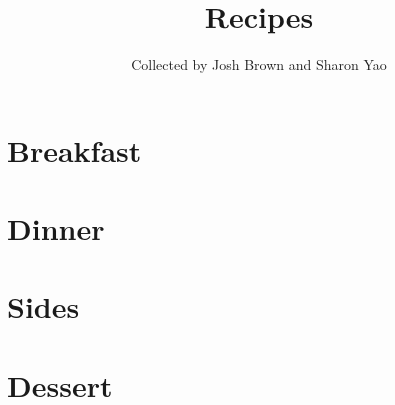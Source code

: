 \documentclass[oneside,10pt]{book}
\title{\bf \Huge Recipes}
\author{Collected by Josh Brown and Sharon Yao}
\date{}
\begin{document}
\maketitle
\tableofcontents{}

\chapter{Breakfast}
    
    
    
    
    

\chapter{Dinner}
    
    
    
    
    
    
    
    
    
    
    

\chapter{Sides}
    
    

\chapter{Dessert}
    
    
    
    
\end{document}
